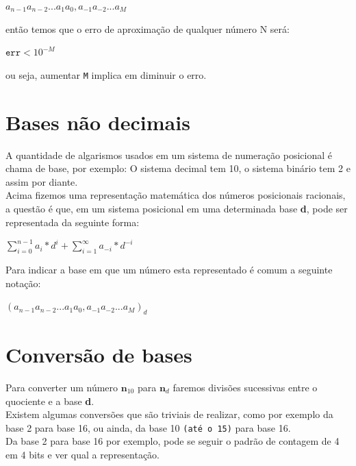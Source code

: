 \documentclass[12pt, onecolumn]{article}
\begin{document}
	\begin{center}
		$a_{n-1} a_{n-2} ... a_{1} a_{0}, a_{-1} a_{-2} ... a_{M}$
	\end{center}

	então temos que o erro de aproximação de qualquer número N será:

	\begin{center}
		$\texttt{err} < 10^{-M}$
	\end{center}
	
	ou seja, aumentar \texttt{M} implica em diminuir o erro.
	
	\section{\centering Bases não decimais}

	A quantidade de algarismos usados em um sistema de numeração posicional é
	chama de base, por exemplo: O sistema decimal tem 10, 
	o sistema binário tem 2 e assim por diante. \\
	\newline
	Acima fizemos uma representação matemática dos números posicionais 
	racionais, a questão é que, em um sistema posicional em uma determinada
	base \textbf{d}, pode ser representada da seguinte forma: 

	\begin{center}
		$\sum_{i=0}^{n-1} a_{i} * d^{i} + 
		\sum_{i=1}^{\infty} a_{-i} * d^{-i}$
	\end{center}

	Para indicar a base em que um número esta representado é comum a 
	seguinte notação:

	\begin{center}
		$(a_{n-1} a_{n-2} ... a_{1} a_{0}, a_{-1} a_{-2} ... a_{M})_d$
	\end{center}

	\section{\centering Conversão de bases}

	Para converter um número $\textbf{n}_{10}$ para $\textbf{n}_{d}$ faremos
	divisões sucessivas entre o quociente e a base \textbf{d}.\\
	\newline
	Existem algumas conversões que são triviais de realizar, como por exemplo
	da base 2 para base 16, ou ainda, da base 10 \texttt{(até o 15)} 
	para base 16. \\
	\newline
	Da base 2 para base 16 por exemplo, pode se seguir o padrão de contagem 
	de 4 em 4 bits e ver qual a representação.
	
\end{document}
